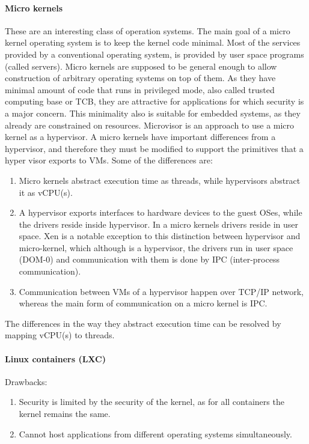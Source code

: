 \documentclass[a4paper,10pt]{article}
\begin{document}
  \paragraph{Micro kernels}
  These are an interesting class of operation systems. The main goal of a micro kernel operating system is to keep the kernel code minimal. Most of the services provided by
  a conventional operating system, is provided by user space programs (called servers). Micro kernels are supposed to be general enough to allow construction of
  arbitrary operating systems on top of them. As they have minimal amount of code that runs in privileged mode, also called trusted computing base or TCB, they are
  attractive for applications for which security is a major concern. This minimality also is suitable for embedded systems, as they already are constrained on
  resources. Microvisor\cite{Heiser:2010:OMC:1851276.1851282} is an approach to use a micro kernel as a hypervisor. A micro kernels have important differences from
  a hypervisor, and therefore they must be modified to support the primitives that a hyper visor exports to VMs.
  Some of the differences are:
  \begin{enumerate}
  \item Micro kernels abstract execution time as threads, while hypervisors abstract it as vCPU(s).
  \item A hypervisor exports interfaces to hardware devices to the guest OSes, while the drivers reside inside hypervisor. In a micro kernels drivers reside in user space. Xen
  is a notable exception to this distinction between hypervisor and micro-kernel, which although is a hypervisor, the drivers run in user space (DOM-0) and communication with them
  is done by IPC (inter-process communication).
  \item Communication between VMs of a hypervisor happen over TCP/IP network, whereas the main form of communication on a micro kernel is IPC.
  \end{enumerate}
  
  The differences in the way they abstract execution time can be resolved by mapping vCPU(s) to threads.
  
  \paragraph{Linux containers (LXC)}
  Drawbacks:\\
  \begin{enumerate}
   \item Security is limited by the security of the kernel, as for all containers the kernel remains the same.
   \item Cannot host applications from different operating systems simultaneously.
  \end{enumerate}
\end{document}
